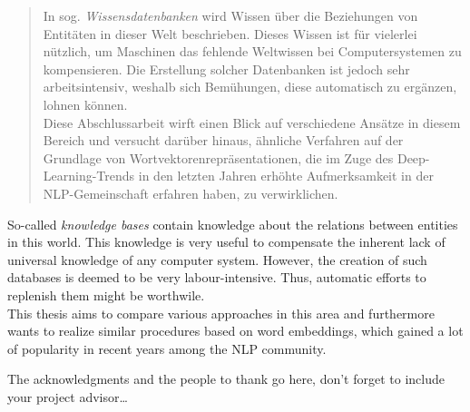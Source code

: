 \documentclass[
captions=nooneline,
11pt, %
ngerman, %
singlespacing, %
headsepline, %
]{MastersDoctoralThesis} %
\begin{document}
\begin{abstract}
\addchaptertocentry{\abstractname} %

In sog. \emph{Wissensdatenbanken} wird Wissen über die Beziehungen von Entitäten in dieser Welt
beschrieben. Dieses Wissen ist für vielerlei nützlich, um Maschinen das fehlende Weltwissen
bei Computersystemen zu kompensieren. Die Erstellung solcher Datenbanken ist jedoch sehr
arbeitsintensiv, weshalb sich Bemühungen, diese automatisch zu ergänzen, lohnen können.\\
Diese Abschlussarbeit wirft einen Blick auf verschiedene Ansätze in diesem Bereich und
versucht darüber hinaus, ähnliche Verfahren auf der Grundlage von Wortvektorenrepräsentationen,
die im Zuge des Deep-Learning-Trends in den letzten Jahren erhöhte Aufmerksamkeit in der
NLP-Gemeinschaft erfahren haben, zu verwirklichen.

\end{abstract}


\begin{abstracteng}

So-called \emph{knowledge bases} contain knowledge about the relations between entities in
this world. This knowledge is very useful to compensate the inherent lack of universal knowledge
of any computer system. However, the creation of such databases is deemed to be very labour-intensive.
Thus, automatic efforts to replenish them might be worthwile.\\
This thesis aims to compare various approaches in this area and furthermore wants to realize similar
procedures based on word embeddings, which gained a lot of popularity in recent years among the
NLP community.

\end{abstracteng}



\begin{acknowledgements}
\addchaptertocentry{\acknowledgementname} %

The acknowledgments and the people to thank go here, don't forget to include your project advisor\ldots

\end{acknowledgements}
\end{document}
